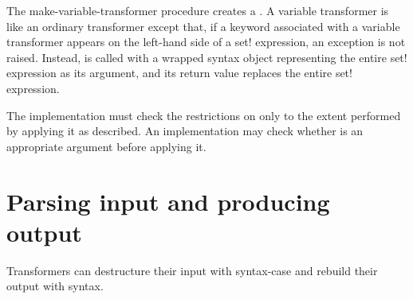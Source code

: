 \begin{entry}{%
}


The {\cf make-variable-transformer} procedure creates a
.
A variable transformer is like an ordinary transformer except
that, if a keyword associated with a variable transformer appears on
the left-hand side of a {\cf set!} expression, an exception is
not raised.
Instead,  is called with a
wrapped syntax object representing the entire {\cf set!} expression as
its argument, and its return value replaces the entire {\cf set!}
expression.

\implresp The implementation must check the restrictions on 
only to the extent performed by applying it as described.
An
implementation may check whether  is an appropriate argument
before applying it.
\end{entry}

\section{Parsing input and producing output}
\label{syntaxcasesection}

Transformers can destructure their input with {\cf syntax-case} and rebuild
their output with {\cf syntax}.

